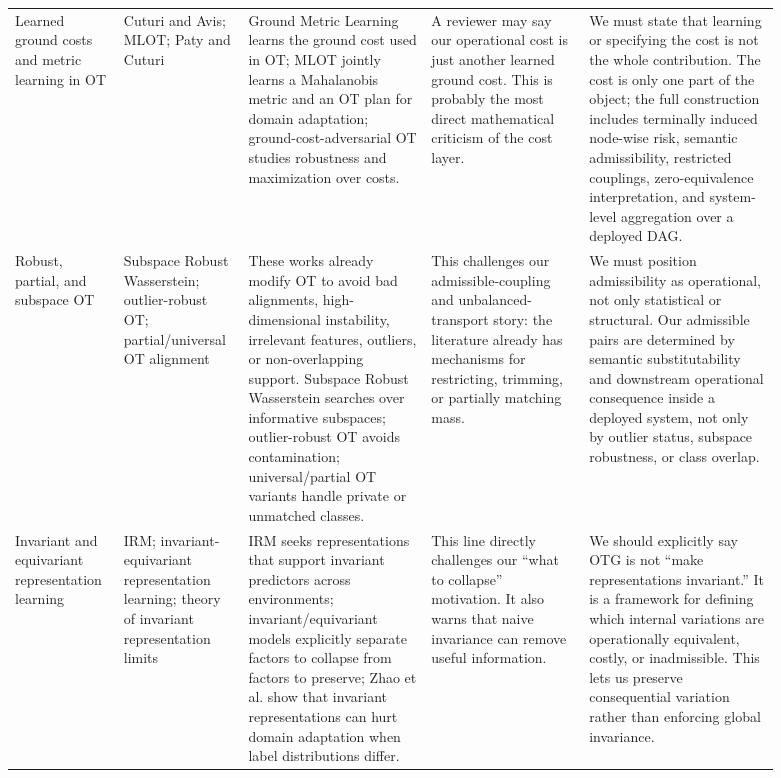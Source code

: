 \documentclass[11pt,a4paper]{article}
\begin{document}
\begin{landscape}
\begin{longtable}{@{}P{0.12\linewidth} P{0.13\linewidth} P{0.22\linewidth} P{0.19\linewidth} P{0.23\linewidth}@{}}
Learned ground costs and metric learning in OT & Cuturi and Avis; MLOT; Paty and Cuturi & Ground Metric Learning learns the ground cost used in OT; MLOT jointly learns a Mahalanobis metric and an OT plan for domain adaptation; ground-cost-adversarial OT studies robustness and maximization over costs. & A reviewer may say our operational cost is just another learned ground cost. This is probably the most direct mathematical criticism of the cost layer. & We must state that learning or specifying the cost is not the whole contribution. The cost is only one part of the object; the full construction includes terminally induced node-wise risk, semantic admissibility, restricted couplings, zero-equivalence interpretation, and system-level aggregation over a deployed DAG.\\
Robust, partial, and subspace OT & Subspace Robust Wasserstein; outlier-robust OT; partial/universal OT alignment & These works already modify OT to avoid bad alignments, high-dimensional instability, irrelevant features, outliers, or non-overlapping support. Subspace Robust Wasserstein searches over informative subspaces; outlier-robust OT avoids contamination; universal/partial OT variants handle private or unmatched classes. & This challenges our admissible-coupling and unbalanced-transport story: the literature already has mechanisms for restricting, trimming, or partially matching mass. & We must position admissibility as operational, not only statistical or structural. Our admissible pairs are determined by semantic substitutability and downstream operational consequence inside a deployed system, not only by outlier status, subspace robustness, or class overlap.\\
Invariant and equivariant representation learning & IRM; invariant-equivariant representation learning; theory of invariant representation limits & IRM seeks representations that support invariant predictors across environments; invariant/equivariant models explicitly separate factors to collapse from factors to preserve; Zhao et al. show that invariant representations can hurt domain adaptation when label distributions differ. & This line directly challenges our ``what to collapse'' motivation. It also warns that naive invariance can remove useful information. & We should explicitly say OTG is not ``make representations invariant.'' It is a framework for defining which internal variations are operationally equivalent, costly, or inadmissible. This lets us preserve consequential variation rather than enforcing global invariance.\\

\end{longtable}
\end{landscape}
\end{document}
